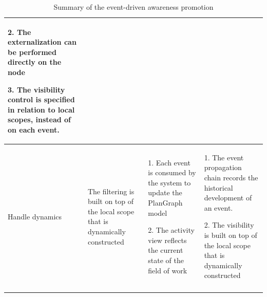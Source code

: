 {\begin{longtable}{>{\raggedright}p{0.8in}>{\raggedright}p{1.5in}>{\raggedright}p{1.5in}>{\raggedright}p{1.7in}}
2. The externalization can be performed directly on the node

3. The visibility control is specified in relation to local scopes,
instead of on each event.\tabularnewline
\midrule 
Handle dynamics & The filtering is built on top of the local scope that is dynamically
constructed & 1. Each event is consumed by the system to update the PlanGraph model

2. The activity view reflects the current state of the field of work & 1. The event propagation chain records the historical development
of an event.

2. The visibility is built on top of the local scope that is dynamically
constructed\tabularnewline
\bottomrule
\caption{Summary of the event-driven awareness promotion}
\label{tab:summary_awareness_promotion}

\end{longtable}
}





 


